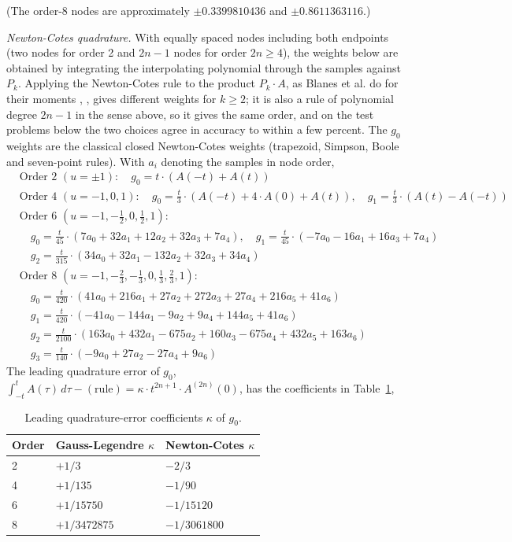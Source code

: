 \documentclass[12pt]{article}
\begin{document}
\noindent (The order-8 nodes are approximately $\pm0.3399810436$ and $\pm0.8611363116$.)

\emph{Newton-Cotes quadrature.} With equally spaced nodes including both endpoints (two nodes for order 2 and $2n-1$ nodes for order $2n\ge4$), the weights below are obtained by integrating the interpolating polynomial through the samples against $P_k$. Applying the Newton-Cotes rule to the product $P_k\cdot A$, as Blanes et al. do for their moments \cite{bcr2000}, \cite{bcor2009}, gives different weights for $k\ge2$; it is also a rule of polynomial degree $2n-1$ in the sense above, so it gives the same order, and on the test problems below the two choices agree in accuracy to within a few percent. The $g_0$ weights are the classical closed Newton-Cotes weights (trapezoid, Simpson, Boole and seven-point rules). With $a_i$ denoting the samples in node order,
\begin{equation}
\begin{aligned}
&\text{Order 2 }(u=\pm1):\quad g_{0}=t\cdot(A(-t)+A(t))\\
&\text{Order 4 }(u=-1,0,1):\quad g_{0}=\tfrac{t}{3}\cdot(A(-t)+4\cdot A(0)+A(t)),\quad g_{1}=\tfrac{t}{3}\cdot(A(t)-A(-t))\\
&\text{Order 6 }(u=-1,-\tfrac{1}{2},0,\tfrac{1}{2},1):\\
&\quad g_{0}=\tfrac{t}{45}\cdot(7a_{0}+32a_{1}+12a_{2}+32a_{3}+7a_{4}),\quad g_{1}=\tfrac{t}{45}\cdot(-7a_{0}-16a_{1}+16a_{3}+7a_{4})\\
&\quad g_{2}=\tfrac{t}{315}\cdot(34a_{0}+32a_{1}-132a_{2}+32a_{3}+34a_{4})\\
&\text{Order 8 }(u=-1,-\tfrac{2}{3},-\tfrac{1}{3},0,\tfrac{1}{3},\tfrac{2}{3},1):\\
&\quad g_{0}=\tfrac{t}{420}\cdot(41a_{0}+216a_{1}+27a_{2}+272a_{3}+27a_{4}+216a_{5}+41a_{6})\\
&\quad g_{1}=\tfrac{t}{420}\cdot(-41a_{0}-144a_{1}-9a_{2}+9a_{4}+144a_{5}+41a_{6})\\
&\quad g_{2}=\tfrac{t}{2100}\cdot(163a_{0}+432a_{1}-675a_{2}+160a_{3}-675a_{4}+432a_{5}+163a_{6})\\
&\quad g_{3}=\tfrac{t}{140}\cdot(-9a_{0}+27a_{2}-27a_{4}+9a_{6})
\end{aligned}\label{eq:nc}
\end{equation}
The leading quadrature error of $g_0$, $\int_{-t}^{t}A(\tau)\,d\tau-(\text{rule})=\kappa\cdot t^{2n+1}\cdot A^{(2n)}(0)$, has the coefficients in Table~\ref{tab:kappa},

\begin{table}[H]
\centering\small
\caption{Leading quadrature-error coefficients $\kappa$ of $g_0$.}\label{tab:kappa}
\begin{tabular}{lll}
\hline
Order & Gauss-Legendre $\kappa$ & Newton-Cotes $\kappa$ \\ \hline
2 & $+1/3$ & $-2/3$ \\
4 & $+1/135$ & $-1/90$ \\
6 & $+1/15750$ & $-1/15120$ \\
8 & $+1/3472875$ & $-1/3061800$ \\ \hline
\end{tabular}
\end{table}
\end{document}
